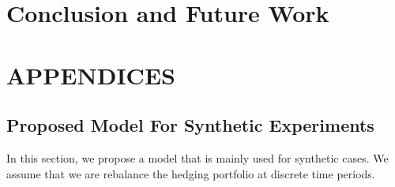 \documentclass[letterpaper,12pt,titlepage,oneside,final]{book}
\numberwithin{equation}{section}
\theoremstyle{definition}
\let\origdoublepage\cleardoublepage
\newcommand{\clearemptydoublepage}{%
  \clearpage{\pagestyle{empty}\origdoublepage}}
\let\cleardoublepage\clearemptydoublepage
\begin{document}
\chapter{Conclusion and Future Work}


\label{sec:Conclusion}



\cleardoublepage %
\renewcommand*{\bibname}{References}




\nocite{*}

\appendix
\chapter*{APPENDICES}

\section{Proposed Model For Synthetic Experiments}
In this section, we propose a model that is mainly used for synthetic cases. We assume that we are rebalance the hedging portfolio at discrete time periods.
\end{document}
